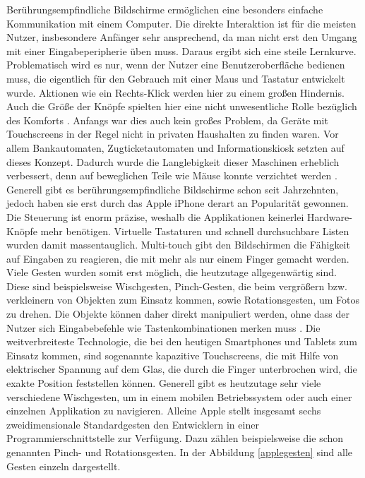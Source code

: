 \documentclass[11pt,a4paper]{report}
\begin{document}
Berührungsempfindliche Bildschirme ermöglichen eine besonders einfache Kommunikation mit einem Computer. Die direkte Interaktion ist für die meisten Nutzer, insbesondere Anfänger sehr ansprechend, da man nicht erst den Umgang mit einer Eingabeperipherie üben muss. Daraus ergibt sich eine steile Lernkurve. Problematisch wird es nur, wenn der Nutzer eine Benutzeroberfläche bedienen muss, die eigentlich für den Gebrauch mit einer Maus und Tastatur entwickelt wurde. Aktionen wie ein Rechts-Klick werden hier zu einem großen Hindernis. Auch die Größe der Knöpfe spielten hier eine nicht unwesentliche Rolle bezüglich des Komforts \cite{benko2006precise}. Anfangs war dies auch kein großes Problem, da Geräte mit Touchscreens in der Regel nicht in privaten Haushalten zu finden waren. Vor allem Bankautomaten, Zugticketautomaten und Informationskiosk setzten auf dieses Konzept. Dadurch wurde die Langlebigkeit dieser Maschinen erheblich verbessert, denn auf beweglichen Teile wie Mäuse konnte verzichtet werden \cite{albinsson2003high}. Generell gibt es berührungsempfindliche Bildschirme schon seit Jahrzehnten, jedoch haben sie erst durch das Apple iPhone derart an Popularität gewonnen. Die Steuerung ist enorm präzise, weshalb die Applikationen keinerlei Hardware-Knöpfe mehr benötigen. Virtuelle Tastaturen und schnell durchsuchbare Listen wurden damit massentauglich. Multi-touch gibt den Bildschirmen die Fähigkeit auf Eingaben zu reagieren, die mit mehr als nur einem Finger gemacht werden. Viele Gesten wurden somit erst möglich, die heutzutage allgegenwärtig sind. Diese sind beispielsweise Wischgesten, Pinch-Gesten, die beim vergrößern bzw. verkleinern von Objekten zum Einsatz kommen, sowie Rotationsgesten, um Fotos zu drehen. Die Objekte können daher direkt manipuliert werden, ohne dass der Nutzer sich Eingabebefehle wie Tastenkombinationen merken muss \cite{kane2008slide}. Die weitverbreiteste Technologie, die bei den heutigen Smartphones und Tablets zum Einsatz kommen, sind sogenannte kapazitive Touchscreens, die mit Hilfe von elektrischer Spannung auf dem Glas, die durch die Finger unterbrochen wird, die exakte Position feststellen können. \cite{laufs2013aufbau} Generell gibt es heutzutage sehr viele verschiedene Wischgesten, um in einem mobilen Betriebssystem oder auch einer einzelnen Applikation zu navigieren. Alleine Apple stellt insgesamt sechs zweidimensionale Standardgesten den Entwicklern in einer Programmierschnittstelle zur Verfügung. Dazu zählen beispielsweise die schon genannten Pinch- und Rotationsgesten. In der Abbildung \ref{applegesten} sind alle Gesten einzeln dargestellt.\begin{figure}[h]

\end{figure}
\end{document}
